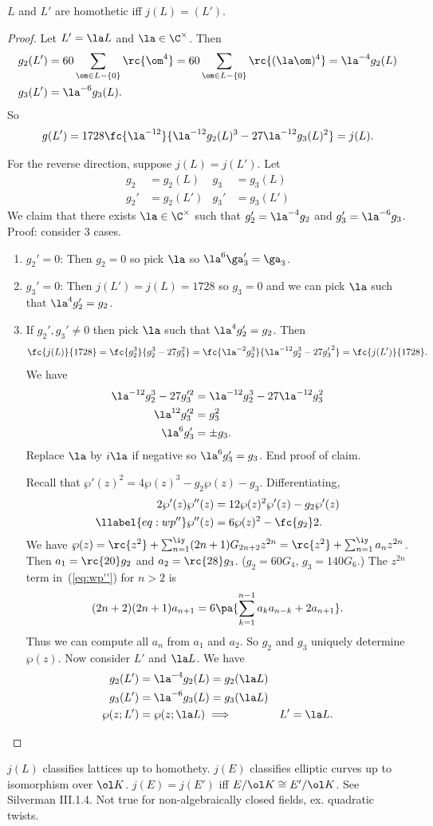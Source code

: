 \begin{thm}
$L$ and $L'$ are homothetic iff $j(L)=(L')$.
\end{thm}
\begin{proof}
Let $L'=\la L$ and $\la\in\C^{\times}$. Then
\begin{align*}
g_2(L')&=60\sum_{\om\in L-\{0\}}\rc{\om^4} = 60\sum_{\om\in L-\{0\}} \rc{(\la \om)^4} =\la^{-4}g_2(L)\\
g_3(L')&=\la^{-6}g_3(L).
\end{align*}
So
\[
g(L')=1728\fc{\la^{-12}}{\la^{-12}g_2(L)^3-27\la^{-12}g_3(L)^2}=j(L).
\]

For the reverse direction, suppose $j(L)=j(L')$. Let
\begin{align*}
g_2&=g_2(L)&
g_3&=g_3(L)\\
g_2'&=g_2(L')&
g_3'&=g_3(L')
\end{align*}
We claim that there exists $\la\in \C^{\times}$ such that $g_2'=\la^{-4}g_2$ and $g_3'=\la^{-6}g_3$.
Proof: consider 3 cases.
\begin{enumerate}
\item
$g_2'=0$: Then $g_2=0$ so pick $\la$ so $\la^6\ga_3'=\ga_3$.
\item
$g_3'=0$: Then $j(L')=j(L)=1728$ so $g_3=0$ and we can pick $\la$ such that $\la^4g_2'=g_2$.
\item
If $g_2',g_3'\ne 0$ then pick $\la$ such that $\la^4g_2'=g_2$. Then
\[
\fc{j(L)}{1728}=\fc{g_2^3}{g_2^3-27g_3^2}=\fc{\la^{-2}g_2^3}{\la^{-12}g_2^3-27{g_3'}^2}=\fc{j(L')}{1728}.
\]
We have
\begin{align*}
\la^{-12}g_2^3-27g_3'^2&=\la^{-12} g_2^3-27\la^{-12}g_3^2\\
\la^{12}g_3'^2&=g_3^2\\
\la^6g_3'&=\pm g_3.
\end{align*}
Replace $\la$ by $i\la$ if negative so $\la^6g_3'=g_3$. End proof of claim.

Recall that $\wp'(z)^2=4\wp(z)^3-g_2\wp(z)-g_3$. Differentiating,
\begin{align}
\nonumber
2\wp'(z)\wp''(z)&=12\wp(z)^2\wp'(z)-g_2\wp'(z)\\
\llabel{eq:wp''}
\wp''(z)&=6\wp(z)^2-\fc{g_2}2.
\end{align}
We have $\wp(z)=\rc{z^2}+\sum_{n=1}^{\iy} (2n+1)G_{2n+2}z^{2n}=\rc{z^2}+\sum_{n=1}^{\iy}a_nz^{2n}$. Then $a_1=\rc{20}g_2$ and $a_2=\rc{28}g_3$. ($g_2=60G_4$, $g_3=140G_6$.) The $z^{2n}$ term in~(\ref{eq:wp''}) for $n>2$ is
\[
(2n+2)(2n+1)a_{n+1}=6\pa{
\sum_{k=1}^{n-1} a_ka_{n-k} +2a_{n+1}
}.
\]
Thus we can compute all $a_n$ from $a_1$ and $a_2$. So $g_2$ and $g_3$ uniquely determine $\wp(z)$. Now consider $L'$ and $\la L$. We have
\begin{align*}
g_2(L')&=\la^{-4}g_2(L)=g_2(\la L)\\
g_3(L')&=\la^{-6}g_3(L)=g_3(\la L)\\
\wp(z;L')&=\wp(z;\la L)\implies & L'=\la L.
\end{align*}
\end{enumerate}
\end{proof}
$j(L)$ classifies lattices up to homothety. $j(E)$ classifies elliptic curves up to isomorphism over $\ol K$. $j(E)=j(E')$ iff $E/\ol K\cong E'/\ol K$. See Silverman III.1.4. Not true for non-algebraically closed fields, ex. quadratic twists.
